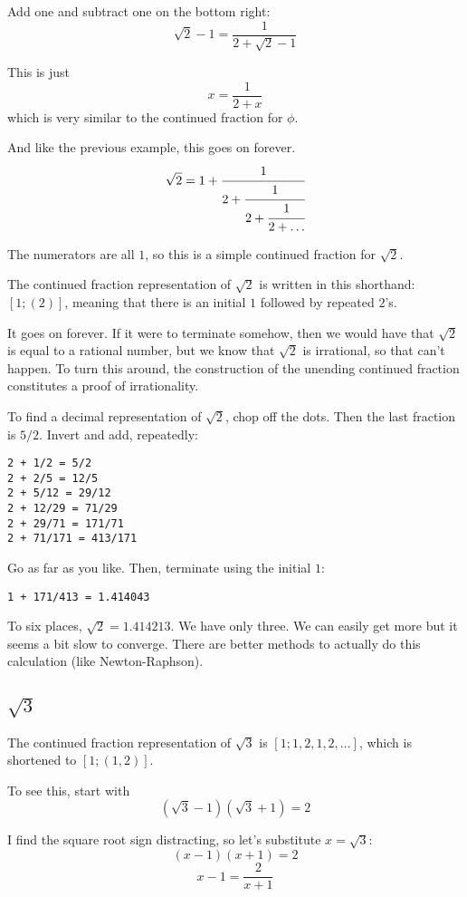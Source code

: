 \documentclass[11pt, oneside]{article}
\begin{document}
Add one and subtract one on the bottom right:
\[ \sqrt{2} - 1 =  \frac{1}{2 + \sqrt{2} - 1} \]

This is just
\[ x = \frac{1}{2 + x} \]
which is very similar to the continued fraction for $\phi$.

And like the previous example, this goes on forever.
\[ \sqrt{2} = 1 + \cfrac{1}{2+\cfrac{1}{2+\cfrac{1}{2 + \dots}}}  \]

The numerators are all $1$, so this is a simple continued fraction for $\sqrt{2}$.

The continued fraction representation of $\sqrt{2}$ is written in this shorthand:  $[1;(2)]$, meaning that there is an initial $1$ followed by repeated $2$'s.

It goes on forever.  If it were to terminate somehow, then we would have that $\sqrt{2}$ is equal to a rational number, but we know that $\sqrt{2}$ is irrational, so that can't happen.  To turn this around, the construction of the unending continued fraction constitutes a  proof of irrationality.

To find a decimal representation of $\sqrt{2}$, chop off the dots.  Then the last fraction is $5/2$.  Invert and add, repeatedly:

\begin{verbatim}
2 + 1/2 = 5/2
2 + 2/5 = 12/5
2 + 5/12 = 29/12
2 + 12/29 = 71/29
2 + 29/71 = 171/71
2 + 71/171 = 413/171
\end{verbatim}

Go as far as you like.  Then, terminate using the initial $1$:
\begin{verbatim}
1 + 171/413 = 1.414043
\end{verbatim}

To six places, $\sqrt{2} = 1.414213$.  We have only three.  We can easily get more but it seems a bit slow to converge.  There are better methods to actually do this calculation (like Newton-Raphson).

\subsection*{$\sqrt{3}$}
The continued fraction representation of $\sqrt{3}$ is $[1;1,2,1,2, \dots]$, which is shortened to $[1;(1,2)]$.  

To see this, start with
\[ (\sqrt{3} - 1)(\sqrt{3} + 1) = 2 \]

I find the square root sign distracting, so let's substitute $x = \sqrt{3}$:
\[ (x - 1)(x + 1) = 2 \]
\[ x - 1 = \frac{2}{x + 1}   \]
\end{document}
